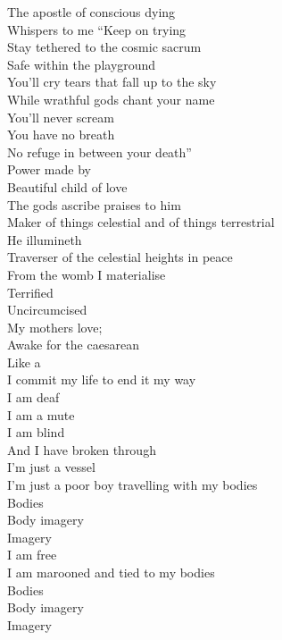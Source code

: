 

The apostle of conscious dying \\
Whispers to me ``Keep on trying \\
Stay tethered to the cosmic sacrum \\
Safe within the  playground \\
You'll cry tears that fall up to the sky \\
While wrathful gods chant your name \\
You'll never scream \\
You have no breath \\
No refuge in between your death'' \\

Power made by  \\
Beautiful child of love \\
The gods ascribe praises to him \\
Maker of things celestial and of things terrestrial \\
He illumineth  \\
Traverser of the celestial heights in peace \\

From the womb I materialise \\
Terrified \\
Uncircumcised \\
My mothers love;  \\
Awake for the caesarean \\
Like a  \\
I commit my life to end it my way \\
I am deaf \\
I am a mute \\
I am blind \\
And I have broken through \\

I'm just a vessel \\
I'm just a poor boy travelling with my bodies \\
Bodies \\
Body imagery \\
Imagery \\
I am free \\
I am marooned and tied to my bodies \\
Bodies \\
Body imagery \\
Imagery \\

